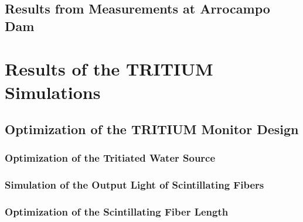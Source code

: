 \documentclass[12pt,a4paper]{book}
\begin{document}
	\section[Experimental Results in Arrocampo Dam]{Results from Measurements at Arrocampo Dam}\label{sec:ResultsArrocampo}
	
	\newpage
		
	
	\chapter{Results of the TRITIUM Simulations}\label{chap:ResultsSimulations}
	
		
		\section[Optimization of the TRITIUM Monitor Design]{Optimization of the TRITIUM Monitor Design}\label{sec:ResultsTRITIUMSimulationsDesign}
				
		
			\subsection[Optimization of the Tritiated Water Source]{Optimization of the Tritiated Water Source}\label{subsec:ResultsShapeSource}
			
		
			\subsection{Simulation of the Output Light of Scintillating Fibers}\label{subsec:ResultsOutputLight}
			
			
			\subsection[Optimization of the Scintillating Fiber Length]{Optimization of the Scintillating Fiber Length}\label{subsec:ResultsFiberLength}
			
		
\end{document}

